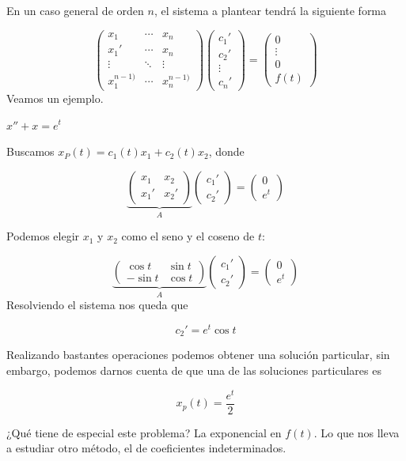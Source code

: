 En un caso general de orden $n$, el sistema a plantear tendrá la siguiente forma

\[ \begin{pmatrix}
x_1 & \cdots & x_n \\
x_1' & \cdots & x_n \\
\vdots & \ddots & \vdots \\
x_1^{n-1)} & \cdots & x_n^{n-1)}
\end{pmatrix} \begin{pmatrix} c_1' \\ c_2' \\ \vdots \\ c_n' \end{pmatrix}
=
\begin{pmatrix}
0 \\ \vdots \\ 0 \\ f(t)
\end{pmatrix} \]
Veamos un ejemplo.

\begin{example}
$x'' + x = e^t$

Buscamos $x_P(t) = c_1(t) x_1 + c_2(t) x_2$, donde

\[ \underbrace{\begin{pmatrix}
x_1 & x_2 \\
x_1' & x_2'
\end{pmatrix}}_A\begin{pmatrix}
c_1' \\ c_2'
\end{pmatrix} = \begin{pmatrix}
0 \\ e^t
\end{pmatrix} \]

Podemos elegir $x_1$ y $x_2$ como el seno y el coseno de $t$:

\[ \underbrace{\begin{pmatrix}
\cos t & \sin t \\
- \sin t & \cos t
\end{pmatrix}}_A\begin{pmatrix}
c_1' \\ c_2'
\end{pmatrix} = \begin{pmatrix}
0 \\ e^t
\end{pmatrix} \]
Resolviendo el sistema nos queda que

\[ c_2' = e^t \cos t \]

Realizando bastantes operaciones podemos obtener una solución particular, sin embargo, podemos darnos cuenta de que una de las soluciones particulares es

\[ x_p(t) = \frac{e^t}{2} \]

¿Qué tiene de especial este problema? La exponencial en $f(t)$. Lo que nos lleva a estudiar otro método, el de coeficientes indeterminados.
\end{example}


